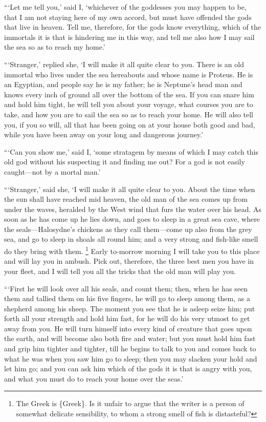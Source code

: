 “‘Let me tell you,’ said I, ‘whichever of the goddesses you may happen to be,
that I am not staying here of my own accord, but must have offended the gods
that live in heaven. Tell me, therefore, for the gods know everything, which of
the immortals it is that is hindering me in this way, and tell me also how I
may sail the sea so as to reach my home.’

“‘Stranger,’ replied she, ‘I will make it all quite clear to you. There is an
old immortal who lives under the sea hereabouts and whose name is Proteus. He
is an Egyptian, and people say he is my father; he is Neptune’s head man and
knows every inch of ground all over the bottom of the sea. If you can snare him
and hold him tight, he will tell you about your voyage, what courses you are to
take, and how you are to sail the sea so as to reach your home. He will also
tell you, if you so will, all that has been going on at your house both good
and bad, while you have been away on your long and dangerous journey.’

“‘Can you show me,’ said I, ‘some stratagem by means of which I may catch this
old god without his suspecting it and finding me out? For a god is not easily
caught—not by a mortal man.’

“‘Stranger,’ said she, ‘I will make it all quite clear to you. About the time
when the sun shall have reached mid heaven, the old man of the sea comes up
from under the waves, heralded by the West wind that furs the water over his
head. As soon as he has come up he lies down, and goes to sleep in a great sea
cave, where the seals—Halosydne’s chickens as they call them—come up also from
the grey sea, and go to sleep in shoals all round him; and a very strong and
fish-like smell do they bring with them. \footnote{The Greek is \{Greek\}. Is it unfair to argue that the writer is a person of
somewhat delicate sensibility, to whom a strong smell of fish is distasteful?} Early to-morrow morning I will take
you to this place and will lay you in ambush. Pick out, therefore, the three
best men you have in your fleet, and I will tell you all the tricks that the
old man will play you.

“‘First he will look over all his seals, and count them; then, when he has seen
them and tallied them on his five fingers, he will go to sleep among them, as a
shepherd among his sheep. The moment you see that he is asleep seize him; put
forth all your strength and hold him fast, for he will do his very utmost to
get away from you. He will turn himself into every kind of creature that goes
upon the earth, and will become also both fire and water; but you must hold him
fast and grip him tighter and tighter, till he begins to talk to you and comes
back to what he was when you saw him go to sleep; then you may slacken your
hold and let him go; and you can ask him which of the gods it is that is angry
with you, and what you must do to reach your home over the seas.’

